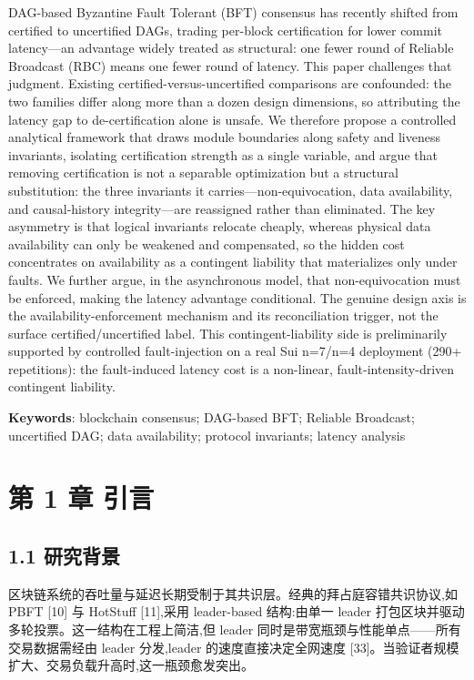 \documentclass[UTF8,fontset=windows,a4paper,11pt]{ctexart}
\begin{document}
DAG-based Byzantine Fault Tolerant (BFT) consensus has recently shifted
from certified to uncertified DAGs, trading per-block certification for
lower commit latency---an advantage widely treated as structural: one
fewer round of Reliable Broadcast (RBC) means one fewer round of
latency. This paper challenges that judgment. Existing
certified-versus-uncertified comparisons are confounded: the two
families differ along more than a dozen design dimensions, so
attributing the latency gap to de-certification alone is unsafe. We
therefore propose a controlled analytical framework that draws module
boundaries along safety and liveness invariants, isolating certification
strength as a single variable, and argue that removing certification is
not a separable optimization but a structural substitution: the three
invariants it carries---non-equivocation, data availability, and
causal-history integrity---are reassigned rather than eliminated. The
key asymmetry is that logical invariants relocate cheaply, whereas
physical data availability can only be weakened and compensated, so the
hidden cost concentrates on availability as a contingent liability that
materializes only under faults. We further argue, in the asynchronous
model, that non-equivocation must be enforced, making the latency
advantage conditional. The genuine design axis is the
availability-enforcement mechanism and its reconciliation trigger, not
the surface certified/uncertified label. This contingent-liability side
is preliminarily supported by controlled fault-injection on a real Sui
n=7/n=4 deployment (290+ repetitions): the fault-induced latency cost is
a non-linear, fault-intensity-driven contingent liability.

\textbf{Keywords}: blockchain consensus; DAG-based BFT; Reliable
Broadcast; uncertified DAG; data availability; protocol invariants;
latency analysis

\section{第 1 章 引言}\label{ux7b2c-1-ux7ae0-ux5f15ux8a00}

\subsection{1.1 研究背景}\label{ux7814ux7a76ux80ccux666f}

区块链系统的吞吐量与延迟长期受制于其共识层。经典的拜占庭容错共识协议,如
PBFT {[}10{]} 与 HotStuff {[}11{]},采用 leader-based 结构:由单一 leader
打包区块并驱动多轮投票。这一结构在工程上简洁,但 leader
同时是带宽瓶颈与性能单点------所有交易数据需经由 leader 分发,leader
的速度直接决定全网速度
{[}33{]}。当验证者规模扩大、交易负载升高时,这一瓶颈愈发突出。
\end{document}
